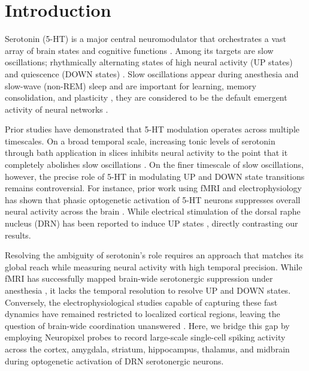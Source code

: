 \documentclass[11pt,a4paper,onecolumn]{article}
\begin{document}
\maketitle
\thispagestyle{empty}

\section*{Introduction}
\vspace{-8pt}

Serotonin (5-HT) is a major central neuromodulator that orchestrates a vast array of brain states and cognitive functions \citep{celada_serotonin_2013}. Among its targets are slow oscillations; rhythmically alternating states of high neural activity (UP states) and quiescence (DOWN states) \citep{steriade_novel_1993}. Slow oscillations appear during anesthesia and slow-wave (non-REM) sleep and are important for learning, memory consolidation, and plasticity \citep{steriade_thalamocortical_1993,steriade_natural_2001,neskeSlowOscillationCortical2015,wilson_spontaneous_1981}, they are considered to be the default emergent activity of neural networks \citep{sanchez-vivesShapingDefaultActivity2017}. 

Prior studies have demonstrated that 5-HT modulation operates across multiple timescales. On a broad temporal scale, increasing tonic levels of serotonin through bath application in slices inhibits neural activity to the point that it completely abolishes slow oscillations \citep{defilippoSomatostatinInterneuronsActivated2021}. On the finer timescale of slow oscillations, however, the precise role of 5-HT in modulating UP and DOWN state transitions remains controversial. For instance, prior work using fMRI and electrophysiology has shown that phasic optogenetic activation of 5-HT neurons suppresses overall neural activity across the brain \citep{hamadaOptogeneticActivationDorsal2022,grandjeanBrainwideFunctionalMap2019}. While electrical stimulation of the dorsal raphe nucleus (DRN) has been reported to induce UP states \citep{defilippoSomatostatinInterneuronsActivated2021}, directly contrasting our results.

Resolving the ambiguity of serotonin's role requires an approach that matches its global reach while measuring neural activity with high temporal precision. While fMRI has successfully mapped brain-wide serotonergic suppression under anesthesia \citep{hamadaOptogeneticActivationDorsal2022, grandjeanBrainwideFunctionalMap2019}, it lacks the temporal resolution to resolve UP and DOWN states. Conversely, the electrophysiological studies capable of capturing these fast dynamics have remained restricted to localized cortical regions, leaving the question of brain-wide coordination unanswered \citep{grandjeanBrainwideFunctionalMap2019}. Here, we bridge this gap by employing Neuropixel probes to record large-scale single-cell spiking activity across the cortex, amygdala, striatum, hippocampus, thalamus, and midbrain during optogenetic activation of DRN serotonergic neurons. 
\end{document}
